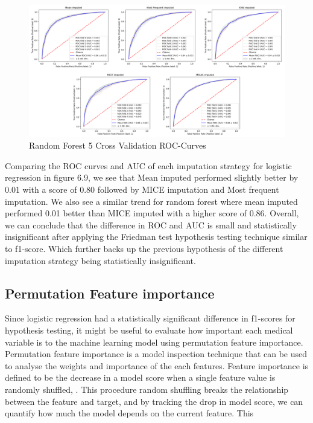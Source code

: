 \documentclass{l4proj}
\begin{document}
 \begin{figure}[!htb]
  \caption{Random Forest 5 Cross Validation ROC-Curves}
  \includegraphics[width=\textwidth]{dissertation/Latex/images/Classification Results/rf_roc.PNG}
\end{figure}

Comparing the ROC curves and AUC of each imputation strategy for logistic regression in figure 6.9, we see that Mean imputed performed slightly better by 0.01 with a score of 0.80 followed by MICE imputation and Most frequent imputation. We also see a similar trend for random forest where mean imputed performed 0.01 better than MICE imputed with a higher score of 0.86. Overall, we can conclude that the difference in ROC and AUC is small and  statistically insignificant after applying the Friedman test hypothesis testing technique similar to f1-score. Which further backs up the previous hypothesis of the different imputation strategy being statistically insignificant.


\subsection{Permutation Feature importance}

Since logistic regression had a statistically significant difference in f1-scores for hypothesis testing, it might be useful to evaluate how important each medical variable is to the machine learning model using permutation feature importance. Permutation feature importance is a model inspection technique that can be used to analyse the weights and importance of the each features. Feature importance is defined to be the decrease in a model score when a single feature value is randomly shuffled, \cite{scikit-learn}. This procedure random shuffling breaks the relationship between the feature and target, and by tracking the drop in model score, we can quantify how much the model depends on the current feature. This 
\end{document}
